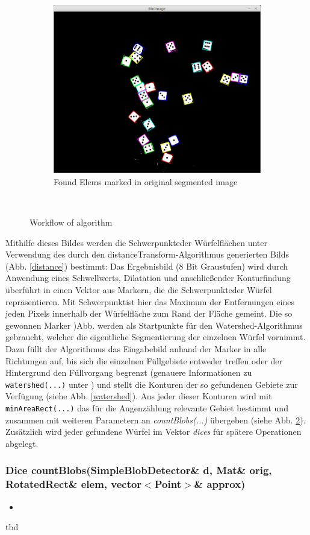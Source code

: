 \documentclass{../Vorlage/sebDenCls}
\begin{document}
\begin{figure}[htp]
\begin{subfigure}{\textwidth}
	\centering
	\includegraphics[width=.7\textwidth]{blobAreas} 
	\caption{Found Elems marked in original segmented image\label{result}}
\end{subfigure}\\
  \caption{Workflow of algorithm}
\end{figure}


Mithilfe dieses Bildes werden die \glqq Schwerpunkte\grqq  der Würfelflächen unter Verwendung des durch den distanceTransform-Algorithmus generierten Bilds (Abb. \ref{distance}) bestimmt: Das Ergebnisbild (8 Bit Graustufen) wird durch Anwendung eines Schwellwerts, Dilatation und anschließender Konturfindung überführt in einen Vektor aus Markern, die die \glqq Schwerpunkte\grqq  der Würfel repräsentieren. Mit \glqq Schwerpunkt\grqq  ist hier das Maximum der Entfernungen eines jeden Pixels innerhalb der Würfelfläche zum Rand der Fläche gemeint. 
Die so gewonnen Marker )Abb.  werden als Startpunkte für den Watershed-Algorithmus gebraucht, welcher die eigentliche Segmentierung der einzelnen Würfel vornimmt. Dazu füllt der Algorithmus das Eingabebild anhand der Marker in alle Richtungen auf, bis sich die einzelnen Füllgebiete entweder treffen oder der Hintergrund den Füllvorgang begrenzt (genauere Informationen zu \texttt{watershed(...)} unter \cite{opCV15}) und stellt die Konturen der so gefundenen Gebiete zur Verfügung (siehe Abb. \ref{watershed}). 
Aus jeder dieser Konturen wird mit\texttt{ minAreaRect(...)} das für die Augenzählung relevante Gebiet bestimmt und zusammen mit weiteren Parametern an \emph{countBlobs(...)} übergeben (siehe Abb. \ref{result}). Zusätzlich wird jeder gefundene Würfel im Vektor \emph{dices} für spätere Operationen abgelegt.

\subsubsection{Dice countBlobs(SimpleBlobDetector\& d, Mat\& orig, RotatedRect\& elem, vector$<$Point$>$\& approx)}
\begin{itemize}
	\item 
\end{itemize}
tbd
\end{document}
